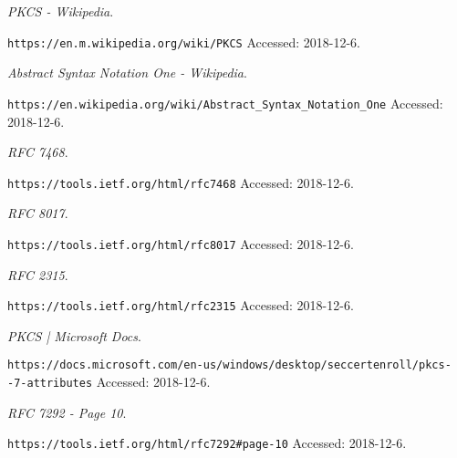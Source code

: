 \documentclass[11pt]{article}
\begin{document}
\begin{thebibliography}{99}


{\em PKCS - Wikipedia}.

  \verb|https://en.m.wikipedia.org/wiki/PKCS|
  \newblock Accessed: 2018-12-6.

{\em Abstract Syntax Notation One - Wikipedia}.

  \verb|https://en.wikipedia.org/wiki/Abstract_Syntax_Notation_One|
  \newblock Accessed: 2018-12-6.

{\em RFC 7468}.

  \verb|https://tools.ietf.org/html/rfc7468|
  \newblock Accessed: 2018-12-6.

{\em RFC 8017}.

  \verb|https://tools.ietf.org/html/rfc8017|
  \newblock Accessed: 2018-12-6.

{\em RFC 2315}.

  \verb|https://tools.ietf.org/html/rfc2315|
  \newblock Accessed: 2018-12-6.

{\em PKCS | Microsoft Docs}.

  \verb|https://docs.microsoft.com/en-us/windows/desktop/seccertenroll/pkcs--7-attributes|
  \newblock Accessed: 2018-12-6.

{\em RFC 7292 - Page 10}.

  \verb|https://tools.ietf.org/html/rfc7292#page-10|
  \newblock Accessed: 2018-12-6.

\end{thebibliography}
\end{document}
